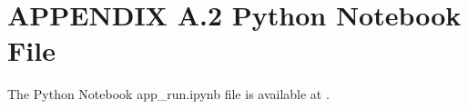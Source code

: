 \begin{comment}
_Example of Transfer Leaning:_
1. (Dataset folder is required: https://github.com/ozanguldali/modelsWithLASSO
/blob/master/dataset)
- Unless exists, 92.16_resnet50_Adam_out.pth file must be downloaded and 
inserted into "cnn/saved_models" directory.
- Link to file:
  - https://github.com/ozanguldali/modelsWithLASSO/blob/master/cnn
  /saved_models/92.16_resnet50_Adam_out.pth
    
`app.main(transfer_learning=True, ml_model_name="all",
ml_features="all", cnn_model_name="resnet50", is_pre_trained=True,
         cv=10, dataset_folder="dataset", 
         pretrain_file="92.16_resnet50_Adam_out", seed=4)`
  
2. (Dataset folder is not needed)
- Unless exists, 92.16_resnet50_Adam_final_X_cnn_train.npy,
92.16_resnet50_Adam_final_X_cnn_test.npy, X_info_train.npy, 
X_info_test.npy, y_train.npy, and y_test.npy files must be 
downloaded and inserted into project root directory.
- Link to files: 
  - https://github.com/ozanguldali/modelsWithLASSO/blob/master
  /92.16_resnet50_Adam_final_X_cnn_train.npy
  - https://github.com/ozanguldali/modelsWithLASSO/blob/master
  /92.16_resnet50_Adam_final_X_cnn_test.npy
  - https://github.com/ozanguldali/modelsWithLASSO/blob/master
  /X_info_train.npy
  - https://github.com/ozanguldali/modelsWithLASSO/blob/master
  /X_info_test.npy
  - https://github.com/ozanguldali/modelsWithLASSO/blob/master
  /y_train.npy
  - https://github.com/ozanguldali/modelsWithLASSO/blob/master
  /y_test.npy
    
`app.main(transfer_learning=True, ml_model_name="all", ml_features="all", load_numpy=True, validate_cv=True, cv=10,
         numpy_prefix="92.16_resnet50_Adam_final", seed=4)`

---

### Package Versions
- Python Language: 3.7.6
- Clang: 4.0.1
- pip: 20.1.1


- PyTorch: 1.5.0
- TorchSummary: 1.5.1
- TorchVision 0.6.0


- Scikit-Learn: 0.23.2


- R Language: 4.0.3
- TULIP: 1.0.1


- TensorFlow: 2.3.1
- TensorFlow-Addons: 0.11.2
- TensorFlow-Estimator: 2.3.0
- TensorFlow-Hub: 0.10.0
- TensorFlow-Probability: 0.10.0


- log4p: 2019.7.13.3
- log4python: 0.2.31


\end{verbatim}
\end{comment}



\newpage

\section*{APPENDIX A.2 Python Notebook File}

The Python Notebook app\_run.ipynb file is available at .


% 



\newpage








